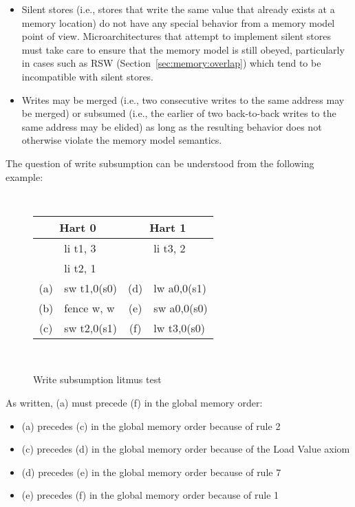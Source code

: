 \begin{itemize}
  \item Silent stores (i.e., stores that write the same value that already exists at a memory location) do not have any special behavior from a memory model point of view.  Microarchitectures that attempt to implement silent stores must take care to ensure that the memory model is still obeyed, particularly in cases such as RSW (Section~\ref{sec:memory:overlap}) which tend to be incompatible with silent stores.
  \item Writes may be merged (i.e., two consecutive writes to the same address may be merged) or subsumed (i.e., the earlier of two back-to-back writes to the same address may be elided) as long as the resulting behavior does not otherwise violate the memory model semantics.
\end{itemize}

The question of write subsumption can be understood from the following example:
\begin{figure}[h!]
  \centering
  {
    \tt\small
    \begin{tabular}{cl||cl}
    \multicolumn{2}{c}{Hart 0} & \multicolumn{2}{c}{Hart 1} \\
    \hline
        & li t1, 3    &     & li  t3, 2    \\
        & li t2, 1    &     &              \\
    (a) & sw t1,0(s0) & (d) & lw  a0,0(s1) \\
    (b) & fence w, w  & (e) & sw  a0,0(s0) \\
    (c) & sw t2,0(s1) & (f) & lw  t3,0(s0) \\
    \end{tabular}
  }
  ~~~~
  \diagram
  \caption{Write subsumption litmus test}
  \label{fig:litmus:subsumption}
\end{figure}

As written, (a) must precede (f) in the global memory order:
\begin{itemize}
  \item (a) precedes (c) in the global memory order because of rule 2
  \item (c) precedes (d) in the global memory order because of the Load Value axiom
  \item (d) precedes (e) in the global memory order because of rule 7
  \item (e) precedes (f) in the global memory order because of rule 1
\end{itemize}

